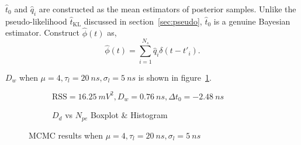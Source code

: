 $\hat{t}_0$ and $\hat{q}_i$ are constructed as the mean estimators of posterior samples.  Unlike the pseudo-likelihood $\hat{t}_\mathrm{KL}$ discussed in section~\ref{sec:pseudo}, $\hat{t}_0$ is a genuine Bayesian estimator.  Construct $\hat{\phi}(t)$ as,
\begin{equation}
  \label{eq:mcmc-phi}
  \hat{\phi}(t) = \sum_{i=1}^{N_s}\hat{q}_i\delta(t-t'_i).
\end{equation}

$D_w$ when $\mu=4, \tau_l=\SI{20}{ns}, \sigma_l=\SI{5}{ns}$ is shown in figure~\ref{fig:mcmc}.
\begin{figure}[H]
  \begin{subfigure}{.5\textwidth}
    \centering
    \resizebox{\textwidth}{!}{}
    \caption{\label{fig:mcmc}$\mathrm{RSS}=\SI{16.25}{mV^2},D_w=\SI{0.76}{ns},\Delta{t_0}=\SI{-2.48}{ns}$}
  \end{subfigure}
  \begin{subfigure}{.5\textwidth}
    \centering
    \resizebox{\textwidth}{!}{}
    \caption{\label{fig:mcmc-npe} $D_d$ vs $N_{pe}$ Boxplot \& Histogram}
  \end{subfigure}
  \caption{MCMC results when $\mu=4, \tau_l=\SI{20}{ns}, \sigma_l=\SI{5}{ns}$}
\end{figure}

